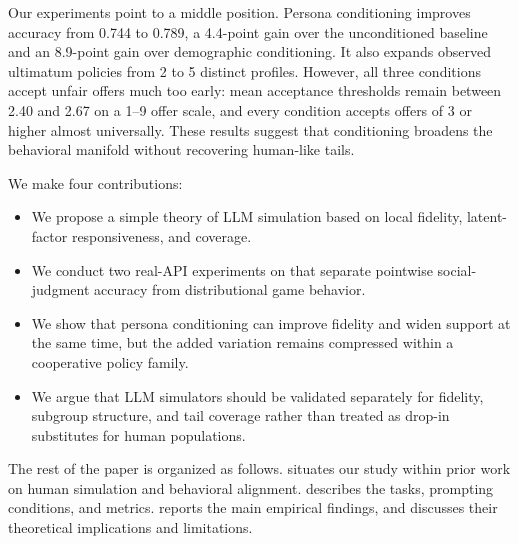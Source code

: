 Our experiments point to a middle position. Persona conditioning improves \socialiqa accuracy from 0.744 to 0.789, a 4.4-point gain over the unconditioned baseline and an 8.9-point gain over demographic conditioning. It also expands observed ultimatum policies from 2 to 5 distinct profiles. However, all three conditions accept unfair offers much too early: mean acceptance thresholds remain between 2.40 and 2.67 on a 1--9 offer scale, and every condition accepts offers of 3 or higher almost universally. These results suggest that conditioning broadens the behavioral manifold without recovering human-like tails.

We make four contributions:
\begin{itemize}
\item We propose a simple theory of LLM simulation based on local fidelity, latent-factor responsiveness, and coverage.
\item We conduct two real-API experiments on \gptfourone that separate pointwise social-judgment accuracy from distributional game behavior.
\item We show that persona conditioning can improve fidelity and widen support at the same time, but the added variation remains compressed within a cooperative policy family.
\item We argue that LLM simulators should be validated separately for fidelity, subgroup structure, and tail coverage rather than treated as drop-in substitutes for human populations.
\end{itemize}

The rest of the paper is organized as follows.  situates our study within prior work on human simulation and behavioral alignment.  describes the tasks, prompting conditions, and metrics.  reports the main empirical findings, and  discusses their theoretical implications and limitations.
